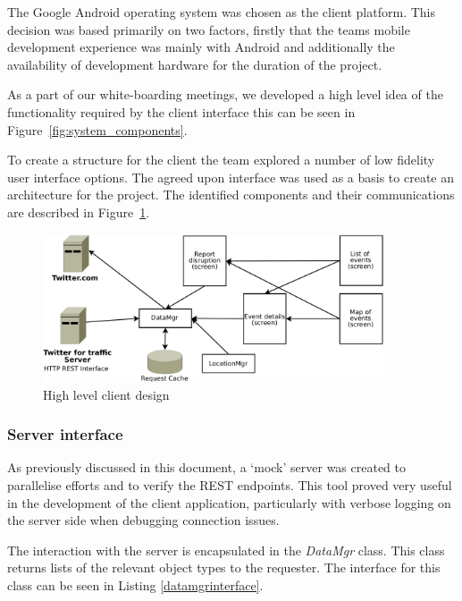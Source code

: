 The Google Android operating system was chosen as the client platform. This
decision was based primarily on two factors, firstly that the teams mobile
development experience was mainly with Android and additionally the
availability of development hardware for the duration of the project.

As a part of our white-boarding meetings, we developed a high level idea of the
functionality required by the client interface this can be seen in
Figure~\ref{fig:system_components}.

To create a structure for the client the team explored a number of low fidelity
user interface options. The agreed upon interface was used as a basis to create
an architecture for the project. The identified components and their
communications are described in Figure~\ref{fig:client_design}.

\begin{figure}[htb]
\centering
\includegraphics[width=0.9\textwidth]{images/design/client/client_high_level_layout.pdf}
\caption{High level client design}
\label{fig:client_design}
\end{figure}


\subsubsection{Server interface}
As previously discussed in this document, a ‘mock’ server was created to
parallelise efforts and to verify the REST endpoints. This tool proved very
useful in the development of the client application, particularly with verbose
logging on the server side when debugging connection issues.

The interaction with the server is encapsulated in the \emph{DataMgr} class.
This class returns lists of the relevant object types to the requester. The
interface for this class can be seen in Listing \ref{datamgrinterface}.


